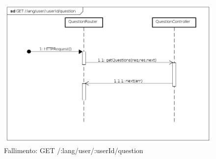 \begin{itemize}
\begin{figure}[ht]
	\centering
	\includegraphics[scale=0.45]{UML/DiagrammiDiSequenza/Back-end/GET__lang_user__userId_question_failure.png}
	\caption{Fallimento: GET /:lang/user/:userId/question}
\end{figure}
\FloatBarrier

\end{itemize}






